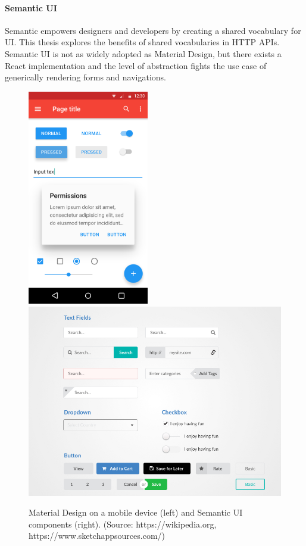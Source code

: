 \paragraph{Semantic UI}
Semantic empowers designers and developers by creating a shared vocabulary for UI. \citep{semanticui} This thesis explores the benefits of shared vocabularies in HTTP APIs. Semantic UI is not as widely adopted as Material Design, but there exists a React implementation and the level of abstraction fights the use case of generically rendering forms and navigations.

\begin{figure}[!htb]
  \includegraphics[width=150pt]
    {images/materialdesign.png}
  \includegraphics[width=320pt]
    {images/semanticui.jpg}
  \caption{Material Design on a mobile device (left) and Semantic UI components (right). (Source: https://wikipedia.org, https://www.sketchappsources.com/)}
\end{figure}

